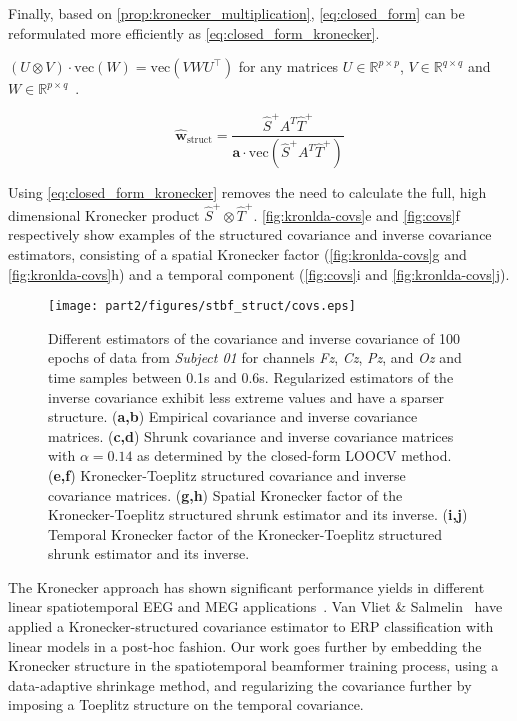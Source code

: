 \begin{refsection}
	Finally, based on \autoref{prop:kronecker_multiplication},
	\autoref{eq:closed_form} can be reformulated more efficiently as
	\autoref{eq:closed_form_kronecker}.
	\begin{property}
		$(U\otimes V)\cdot\text{vec}(W) = \text{vec}(VWU^\intercal)$
		for any matrices $U\in\mathbb{R}^{p\times p}$,
		$V\in\mathbb{R}^{q\times q}$ and $W\in\mathbb{R}^{p\times q}$~\cite{Loan2000}.
		\label{prop:kronecker_multiplication}
	\end{property}

	\begin{equation}
		\hat{\mathbf{w}}_\text{struct} =
		\frac{\hat{S}^+A^T\hat{T}^+}
		{\mathbf{a}\cdot\text{vec}(\hat{S}^+A^T\hat{T}^+)}
		\label{eq:closed_form_kronecker}
	\end{equation}

	Using \autoref{eq:closed_form_kronecker} removes the need to calculate the full, high dimensional Kronecker product $\hat{S}^+\otimes
		\hat{T}^+$.
	\autoref{fig:kronlda-covs}e and \autoref{fig:covs}f respectively show examples of the
	structured covariance and inverse covariance estimators,
	consisting of a spatial Kronecker factor (\autoref{fig:kronlda-covs}g and
	\autoref{fig:kronlda-covs}h) and a temporal component (\autoref{fig:covs}i and
	\autoref{fig:kronlda-covs}j).

	\begin{figure}[p]
		\texttt{[image: part2/figures/stbf\_struct/covs.eps]}
		\caption{Different estimators of the covariance and inverse covariance
			of 100 epochs of data from \textit{Subject 01} for channels
			\textit{Fz}, \textit{Cz}, \textit{Pz}, and \textit{Oz} and time samples between 0.1s and 0.6s.
			Regularized estimators of the inverse covariance exhibit less extreme values and have a sparser structure.
			(\textbf{a,b}) Empirical covariance and inverse covariance matrices.
			(\textbf{c,d}) Shrunk covariance and inverse covariance matrices with $\alpha=0.14$ as
			determined by the closed-form LOOCV method. (\textbf{e,f}) Kronecker-Toeplitz
			structured covariance and inverse covariance matrices.
			(\textbf{g,h}) Spatial Kronecker factor of the Kronecker-Toeplitz structured shrunk estimator and its inverse.
			(\textbf{i,j}) Temporal Kronecker factor of the Kronecker-Toeplitz structured shrunk estimator and its inverse.}
		\label{fig:kronlda-covs}
	\end{figure}

	The Kronecker approach has shown significant performance yields in different linear spatiotemporal EEG and MEG
	applications~\cite{DeMunck2002,Huizenga2002,6408231,GonzalezNavarro2016,GonzalezNavarro2017}.
	Van Vliet \& Salmelin~\cite{Vliet2020} have applied a Kronecker-structured covariance estimator to ERP classification with linear models in a post-hoc fashion.
	Our work goes further by embedding the Kronecker structure in the
	spatiotemporal beamformer training process, using a data-adaptive shrinkage
	method, and regularizing the covariance further by imposing a Toeplitz
	structure on the temporal covariance.


\end{refsection}
